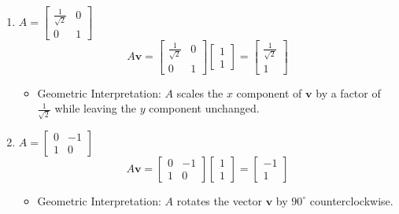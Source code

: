 \begin{intuition}
\begin{enumerate}
            \item $A = \begin{bmatrix} \frac{1}{\sqrt{2}} & 0 \\ 0 & 1 \end{bmatrix}$
            \[
            A \mathbf{v} = \begin{bmatrix} \frac{1}{\sqrt{2}} & 0 \\ 0 & 1 \end{bmatrix} \begin{bmatrix} 1 \\ 1 \end{bmatrix} = \begin{bmatrix} \frac{1}{\sqrt{2}} \\ 1 \end{bmatrix}
            \]
            \begin{itemize}
                \item Geometric Interpretation: $A$ scales the $x$ component of $\mathbf{v}$ by a factor of $\frac{1}{\sqrt{2}}$ while leaving the $y$ component unchanged.
            \end{itemize}
        
            \item $A = \begin{bmatrix} 0 & -1 \\ 1 & 0 \end{bmatrix}$
            \[
            A \mathbf{v} = \begin{bmatrix} 0 & -1 \\ 1 & 0 \end{bmatrix} \begin{bmatrix} 1 \\ 1 \end{bmatrix} = \begin{bmatrix} -1 \\ 1 \end{bmatrix}
            \]
            \begin{itemize}
                \item Geometric Interpretation: $A$ rotates the vector $\mathbf{v}$ by $90^\circ$ counterclockwise.
            \end{itemize}
        

\end{enumerate}
\end{intuition}
